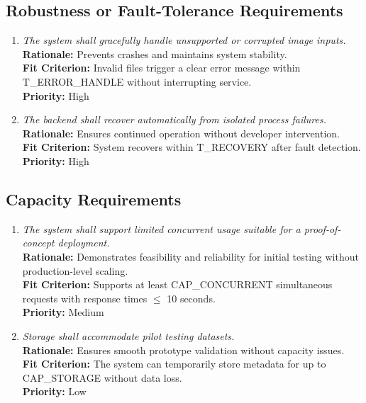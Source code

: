 \documentclass[12pt]{article}
\begin{document}
\subsection{Robustness or Fault-Tolerance Requirements}
\begin{enumerate}[label=PR-RFT \arabic*., wide=0pt, leftmargin=*]
\item \emph{The system shall gracefully handle unsupported or corrupted image inputs.}\\[2mm] 
    {\bf Rationale:} Prevents crashes and maintains system stability.\\
    {\bf Fit Criterion:} Invalid files trigger a clear error message within T\_ERROR\_HANDLE without interrupting service.\\
    {\bf Priority:} High

\item \emph{The backend shall recover automatically from isolated process failures.}\\[2mm] 
    {\bf Rationale:} Ensures continued operation without developer intervention.\\
    {\bf Fit Criterion:} System recovers within T\_RECOVERY after fault detection.\\
    {\bf Priority:} High
\end{enumerate}

\subsection{Capacity Requirements}
\begin{enumerate}[label=PR-CR \arabic*., wide=0pt, leftmargin=*]
\item \emph{The system shall support limited concurrent usage suitable for a proof-of-concept deployment.}\\[2mm] 
    {\bf Rationale:} Demonstrates feasibility and reliability for initial testing without production-level scaling.\\
    {\bf Fit Criterion:} Supports at least CAP\_CONCURRENT simultaneous requests with response times $\leq$ 10 seconds.\\
    {\bf Priority:} Medium

\item \emph{Storage shall accommodate pilot testing datasets.}\\[2mm] 
    {\bf Rationale:} Ensures smooth prototype validation without capacity issues.\\
    {\bf Fit Criterion:} The system can temporarily store metadata for up to CAP\_STORAGE without data loss.\\
    {\bf Priority:} Low
\end{enumerate}
\end{document}
